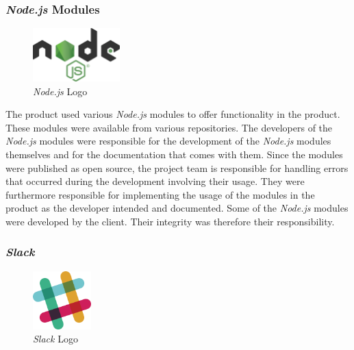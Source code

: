 \subsubsection{\textit{Node.js} Modules}
\label{sssec:nodejs_modules}

\begin{figure}[H]
    \begin{center}
        \includegraphics[width=0.3\textwidth]{images/logos/node-js-logo.png}
        \caption{\textit{Node.js} Logo}
        \label{fig:node-js-logo}
    \end{center}
\end{figure}

The product used various \textit{Node.js} modules to offer functionality in the product. These modules were available from various repositories.
\newline
The developers of the \textit{Node.js} modules were responsible for the development of the \textit{Node.js} modules themselves and for the documentation that comes with them. Since the modules were published as open source, the project team is responsible for handling errors that occurred during the development involving their usage. They were furthermore responsible for implementing the usage of the modules in the product as the developer intended and documented.
\newline
Some of the \textit{Node.js} modules were developed by the client. Their integrity was therefore their responsibility.

\subsubsection{\textit{Slack}}
\label{sssec:slack}

\begin{figure}[H]
    \begin{center}
        \includegraphics[width=0.2\textwidth]{images/logos/slack-logo.png}
        \caption{\textit{Slack} Logo}
        \label{fig:slack-logo}
    \end{center}
\end{figure}

